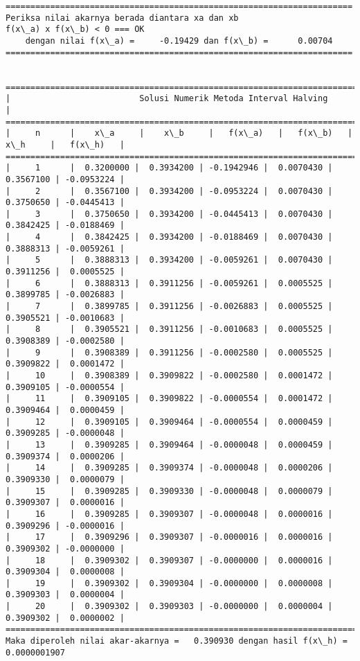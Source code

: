 \documentclass[11pt]{article}
\begin{document}
    \begin{Verbatim}[commandchars=\\\{\}]
======================================================================
Periksa nilai akarnya berada diantara xa dan xb
f(x\_a) x f(x\_b) < 0 === OK 
	dengan nilai f(x\_a) =     -0.19429 dan f(x\_b) =      0.00704
======================================================================


============================================================================================
|                          Solusi Numerik Metoda Interval Halving                          |
============================================================================================
|     n      |    x\_a     |    x\_b     |   f(x\_a)   |   f(x\_b)   |    x\_h     |   f(x\_h)   |
============================================================================================
|     1      |  0.3200000 |  0.3934200 | -0.1942946 |  0.0070430 |  0.3567100 | -0.0953224 |
|     2      |  0.3567100 |  0.3934200 | -0.0953224 |  0.0070430 |  0.3750650 | -0.0445413 |
|     3      |  0.3750650 |  0.3934200 | -0.0445413 |  0.0070430 |  0.3842425 | -0.0188469 |
|     4      |  0.3842425 |  0.3934200 | -0.0188469 |  0.0070430 |  0.3888313 | -0.0059261 |
|     5      |  0.3888313 |  0.3934200 | -0.0059261 |  0.0070430 |  0.3911256 |  0.0005525 |
|     6      |  0.3888313 |  0.3911256 | -0.0059261 |  0.0005525 |  0.3899785 | -0.0026883 |
|     7      |  0.3899785 |  0.3911256 | -0.0026883 |  0.0005525 |  0.3905521 | -0.0010683 |
|     8      |  0.3905521 |  0.3911256 | -0.0010683 |  0.0005525 |  0.3908389 | -0.0002580 |
|     9      |  0.3908389 |  0.3911256 | -0.0002580 |  0.0005525 |  0.3909822 |  0.0001472 |
|     10     |  0.3908389 |  0.3909822 | -0.0002580 |  0.0001472 |  0.3909105 | -0.0000554 |
|     11     |  0.3909105 |  0.3909822 | -0.0000554 |  0.0001472 |  0.3909464 |  0.0000459 |
|     12     |  0.3909105 |  0.3909464 | -0.0000554 |  0.0000459 |  0.3909285 | -0.0000048 |
|     13     |  0.3909285 |  0.3909464 | -0.0000048 |  0.0000459 |  0.3909374 |  0.0000206 |
|     14     |  0.3909285 |  0.3909374 | -0.0000048 |  0.0000206 |  0.3909330 |  0.0000079 |
|     15     |  0.3909285 |  0.3909330 | -0.0000048 |  0.0000079 |  0.3909307 |  0.0000016 |
|     16     |  0.3909285 |  0.3909307 | -0.0000048 |  0.0000016 |  0.3909296 | -0.0000016 |
|     17     |  0.3909296 |  0.3909307 | -0.0000016 |  0.0000016 |  0.3909302 | -0.0000000 |
|     18     |  0.3909302 |  0.3909307 | -0.0000000 |  0.0000016 |  0.3909304 |  0.0000008 |
|     19     |  0.3909302 |  0.3909304 | -0.0000000 |  0.0000008 |  0.3909303 |  0.0000004 |
|     20     |  0.3909302 |  0.3909303 | -0.0000000 |  0.0000004 |  0.3909302 |  0.0000002 |
============================================================================================
Maka diperoleh nilai akar-akarnya =   0.390930 dengan hasil f(x\_h) =    0.0000001907

    \end{Verbatim}
\end{document}
